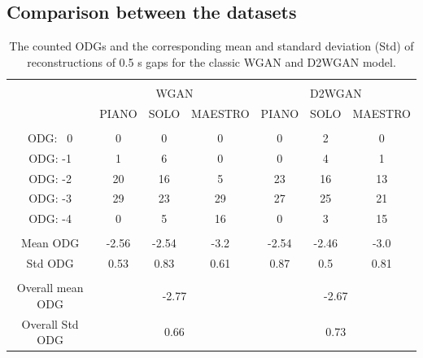 \documentclass{article} %
\begin{document}
\subsection{Comparison between the datasets}

\begin{table}[ht]
    \centering
    \begin{tabular}{c | c c c | c c c}
         \hline
         \\[-0.8em]
         & \multicolumn{3}{c|}{WGAN} & \multicolumn{3}{c}{D2WGAN} \\
         & PIANO & SOLO & MAESTRO & PIANO & SOLO & MAESTRO \\
        \hline
        \\[-0.8em]
        ODG: \ 0     & 0 & 0 & 0 & 0 & 2 & 0 \\
        ODG: -1    & 1 & 6 & 0 & 0 & 4 & 1 \\
        ODG: -2    & 20 & 16 & 5 & 23 & 16 & 13 \\
        ODG: -3    & 29 & 23 & 29 & 27 & 25 & 21 \\
        ODG: -4    & 0 & 5 & 16 & 0 & 3 & 15 \\
        \hline
        \\[-0.8em]
        Mean ODG    & -2.56 & -2.54 & -3.2 & -2.54 & -2.46 & -3.0 \\
        Std ODG     & 0.53 & 0.83 & 0.61 & 0.87 & 0.5 & 0.81 \\
        \hline
        \\[-0.8em]
        Overall mean ODG & \multicolumn{3}{c|}{-2.77} & \multicolumn{3}{c}{-2.67} \\
        Overall Std ODG & \multicolumn{3}{c|}{0.66} & \multicolumn{3}{c}{0.73} \\
        \hline
    \end{tabular}
    \caption{The counted ODGs and the corresponding mean and standard deviation (Std) of reconstructions of 0.5 s gaps for the classic WGAN and D2WGAN model.}
    \label{tab:odgs}
\end{table}
\end{document}
